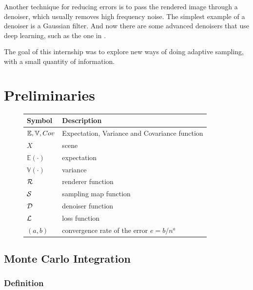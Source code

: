 \documentclass{classeENS}
\begin{document}
\par Another technique for reducing errors is to pass the rendered image 
through a denoiser, which usually removes high frequency noise. The 
simplest example of a denoiser is a Gaussian filter. And now there 
are some advanced denoisers that use deep learning, such as the one 
in \cite{10.1145/3072959.3073708}.  

\par The goal of this internship was to explore new ways of doing adaptive 
sampling, with a small quantity of information.
\section{Preliminaries}

\begin{figure}[H]
    \centering
    \begin{tabular}{C{2cm} L{10cm}}
    \hline  
        Symbol & Description
    \tabularnewline 
    \hline
        $\mathbb E, \mathbb V, Cov$ & Expectation, Variance and Covariance function
    \tabularnewline
        $X$ & scene
    \tabularnewline
        $\mathbb E(\cdot)$ & expectation
    \tabularnewline
        $\mathbb V(\cdot)$ & variance
    \tabularnewline
        $\mathcal R$ & renderer function
    \tabularnewline
        $\mathcal S$ & sampling map function
    \tabularnewline
        $\mathcal D$ & denoiser function
    \tabularnewline
        $\mathcal L$ & loss function
    \tabularnewline
        $(a,b)$ & convergence rate of the error $e = b/n^a$
    \tabularnewline
    \hline 
    \end{tabular}
\end{figure}

\subsection{Monte Carlo Integration}

\subsubsection{Definition}\label{montecarlo}
\end{document}
